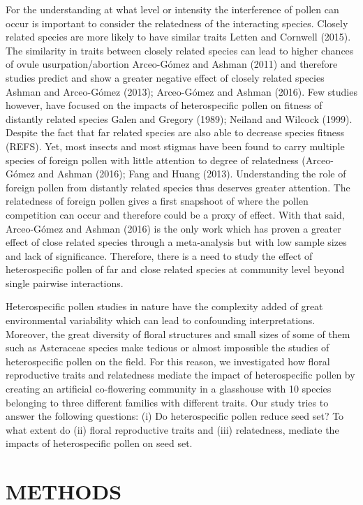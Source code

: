 \documentclass[11pt,a4paper]{article}
\begin{document}
For the understanding at what level or intensity the interference of
pollen can occur is important to consider the relatedness of the
interacting species. Closely related species are more likely to have
similar traits Letten and Cornwell (2015). The similarity in traits
between closely related species can lead to higher chances of ovule
usurpation/abortion Arceo-Gómez and Ashman (2011) and therefore studies
predict and show a greater negative effect of closely related species
Ashman and Arceo-Gómez (2013); Arceo-Gómez and Ashman (2016). Few
studies however, have focused on the impacts of heterospecific pollen on
fitness of distantly related species Galen and Gregory (1989); Neiland
and Wilcock (1999). Despite the fact that far related species are also
able to decrease species fitness (REFS). Yet, most insects and most
stigmas have been found to carry multiple species of foreign pollen with
little attention to degree of relatedness (Arceo-Gómez and Ashman
(2016); Fang and Huang (2013). Understanding the role of foreign pollen
from distantly related species thus deserves greater attention. The
relatedness of foreign pollen gives a first snapshoot of where the
pollen competition can occur and therefore could be a proxy of effect.
With that said, Arceo-Gómez and Ashman (2016) is the only work which has
proven a greater effect of close related species through a meta-analysis
but with low sample sizes and lack of significance. Therefore, there is
a need to study the effect of heterospecific pollen of far and close
related species at community level beyond single pairwise interactions.

Heterospecific pollen studies in nature have the complexity added of
great environmental variability which can lead to confounding
interpretations. Moreover, the great diversity of floral structures and
small sizes of some of them such as Asteraceae species make tedious or
almost impossible the studies of heterospecific pollen on the field. For
this reason, we investigated how floral reproductive traits and
relatedness mediate the impact of heterospecific pollen by creating an
artificial co-flowering community in a glasshouse with 10 species
belonging to three different families with different traits. Our study
tries to answer the following questions: (i) Do heterospecific pollen
reduce seed set? To what extent do (ii) floral reproductive traits and
(iii) relatedness, mediate the impacts of heterospecific pollen on seed
set.

\section{METHODS}\label{methods}
\end{document}
